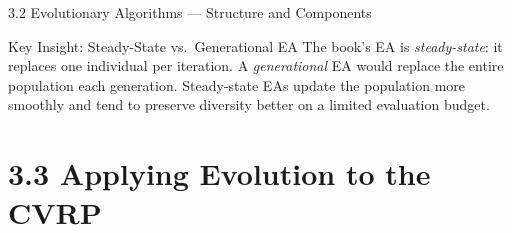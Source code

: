 \documentclass[aspectratio=169,10pt]{beamer}
\begin{document}
\begin{frame}[allowframebreaks]{3.2 Evolutionary Algorithms — Structure and Components}
  \begin{alertblock}{Key Insight: Steady-State vs.\ Generational EA}
    The book's EA is \emph{steady-state}: it replaces one individual per iteration.
    A \emph{generational} EA would replace the entire population each generation.
    Steady-state EAs update the population more smoothly and tend to preserve diversity better
    on a limited evaluation budget.
  \end{alertblock}

\end{frame}

\section{3.3 Applying Evolution to the CVRP}
\end{document}
